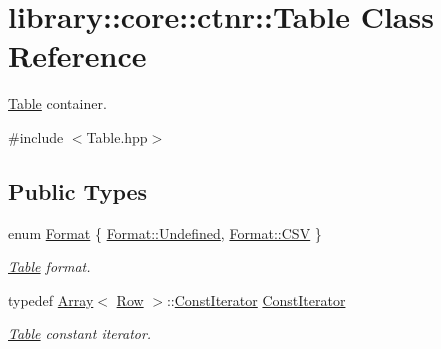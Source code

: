 \hypertarget{classlibrary_1_1core_1_1ctnr_1_1_table}{}\section{library\+:\+:core\+:\+:ctnr\+:\+:Table Class Reference}
\label{classlibrary_1_1core_1_1ctnr_1_1_table}


\hyperlink{classlibrary_1_1core_1_1ctnr_1_1_table}{Table} container.  




{\ttfamily \#include $<$Table.\+hpp$>$}

\subsection*{Public Types}
\begin{DoxyCompactItemize}
\item 
enum \hyperlink{classlibrary_1_1core_1_1ctnr_1_1_table_ab1d81689432c3a6bc960d33db1e11a4c}{Format} \{ \hyperlink{classlibrary_1_1core_1_1ctnr_1_1_table_ab1d81689432c3a6bc960d33db1e11a4caec0fc0100c4fc1ce4eea230c3dc10360}{Format\+::\+Undefined}, 
\hyperlink{classlibrary_1_1core_1_1ctnr_1_1_table_ab1d81689432c3a6bc960d33db1e11a4cacc8d68c551c4a9a6d5313e07de4deafd}{Format\+::\+C\+SV}
 \}\begin{DoxyCompactList}\small\item\em \hyperlink{classlibrary_1_1core_1_1ctnr_1_1_table}{Table} format. \end{DoxyCompactList}
\item 
typedef \hyperlink{classlibrary_1_1core_1_1ctnr_1_1_array}{Array}$<$ \hyperlink{classlibrary_1_1core_1_1ctnr_1_1table_1_1_row}{Row} $>$\+::\hyperlink{classlibrary_1_1core_1_1ctnr_1_1_table_a7fa78ad4e7e8d27ceab0bff51ab84fc3}{Const\+Iterator} \hyperlink{classlibrary_1_1core_1_1ctnr_1_1_table_a7fa78ad4e7e8d27ceab0bff51ab84fc3}{Const\+Iterator}
\begin{DoxyCompactList}\small\item\em \hyperlink{classlibrary_1_1core_1_1ctnr_1_1_table}{Table} constant iterator. \end{DoxyCompactList}\end{DoxyCompactItemize}
